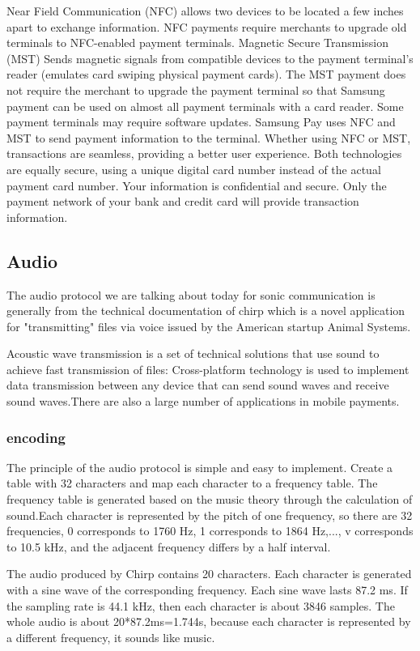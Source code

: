 \documentclass[journal]{IEEEtran}
\begin{document}
Near Field Communication (NFC) allows two devices to be located a few inches apart to exchange information. NFC payments require merchants to upgrade old terminals to NFC-enabled payment terminals. Magnetic Secure Transmission (MST) Sends magnetic signals from compatible devices to the payment terminal's reader (emulates card swiping physical payment cards). The MST payment does not require the merchant to upgrade the payment terminal so that Samsung payment can be used on almost all payment terminals with a card reader. Some payment terminals may require software updates. Samsung Pay uses NFC and MST to send payment information to the terminal. Whether using NFC or MST, transactions are seamless, providing a better user experience. Both technologies are equally secure, using a unique digital card number instead of the actual payment card number. Your information is confidential and secure. Only the payment network of your bank and credit card will provide transaction information.


\subsection{Audio}

The audio protocol we are talking about today for sonic communication is generally from the technical documentation of chirp which is a novel application for "transmitting" files via voice issued by the American startup Animal Systems.

Acoustic wave transmission is a set of technical solutions that use sound to achieve fast transmission of files: Cross-platform technology is used to implement data transmission between any device that can send sound waves and receive sound waves.There are also a large number of applications in mobile payments.

\subsubsection{encoding}
The principle of the audio protocol is simple and easy to implement. Create a table with 32 characters and map each character to a frequency table. The frequency table is generated based on the music theory through the calculation of sound.Each character is represented by the pitch of one frequency, so there are 32 frequencies, 0 corresponds to 1760 Hz, 1 corresponds to 1864 Hz,..., v corresponds to 10.5 kHz, and the adjacent frequency differs by a half interval.

The audio produced by Chirp contains 20 characters. Each character is generated with a sine wave of the corresponding frequency. Each sine wave lasts 87.2 ms. If the sampling rate is 44.1 kHz, then each character is about 3846 samples. The whole audio is about 20*87.2ms=1.744s, because each character is represented by a different frequency, it sounds like music.
\end{document}
